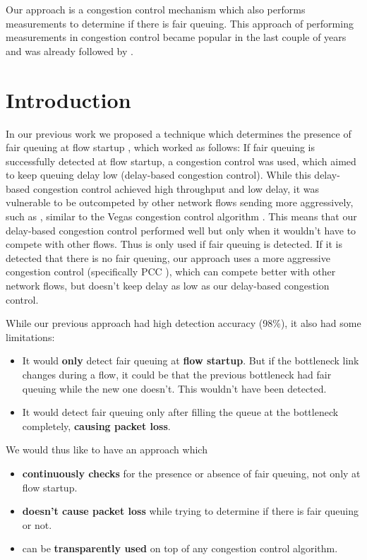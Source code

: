 \documentclass[conference]{IEEEtran}
\begin{document}
Our approach is a congestion control mechanism which also performs measurements to determine if there is fair queuing. 
This approach of performing measurements in congestion control became popular in the last couple of years and was already followed by \cite{cardwell_bbr_2016,dong_pcc_2015,goyal_elasticity_2020,hayes_online_2020}.

\section{Introduction}

In our previous work we proposed a technique which determines the presence of fair queuing at flow startup \cite{bachl_detecting_2021}, which worked as follows: 
If fair queuing is successfully detected at flow startup, a congestion control was used, which aimed to keep queuing delay low (delay-based congestion control). 
While this delay-based congestion control achieved high throughput and low delay, it was vulnerable to be outcompeted by other network flows sending more aggressively, such as \cite{cardwell_bbr_2016,dong_pcc_2015,ha_cubic_2008}, 
similar to the Vegas congestion control algorithm \cite{brakmo_tcp_1995}.
This means that our delay-based congestion control performed well but only when it wouldn't have to compete with other flows. Thus is only used if fair queuing is detected. 
If it is detected that there is no fair queuing, our approach uses a more aggressive congestion control (specifically PCC \cite{dong_pcc_2015}), which can compete better with other network flows,
but doesn't keep delay as low as our delay-based congestion control. 

While our previous approach had high detection accuracy (98\%), it also had some limitations:
\begin{itemize}
    \item It would \textbf{only} detect fair queuing at \textbf{flow startup}. 
    But if the bottleneck link changes during a flow, it could be that the previous bottleneck had fair queuing while the new one doesn't. This wouldn't have been detected. 
    \item It would detect fair queuing only after filling the queue at the bottleneck completely, \textbf{causing packet loss}. 
\end{itemize}

We would thus like to have an approach which 
\begin{itemize}
    \item \textbf{continuously checks} for the presence or absence of fair queuing, not only at flow startup. 
    \item \textbf{doesn't cause packet loss} while trying to determine if there is fair queuing or not. 
    \item can be \textbf{transparently used} on top of any congestion control algorithm. 
\end{itemize} 
\end{document}
